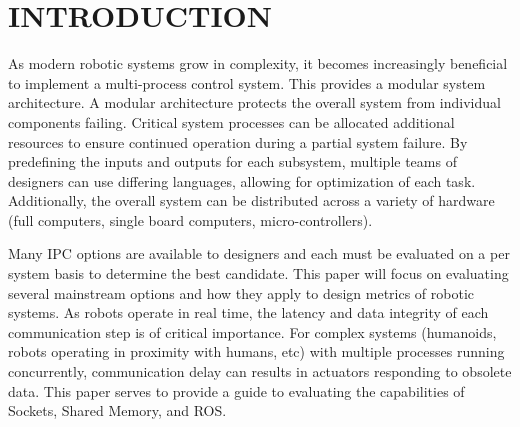 \section{INTRODUCTION}

As modern robotic systems grow in complexity, it becomes increasingly beneficial to implement a multi-process control system. This provides a modular system architecture. A modular architecture protects the overall system from individual components failing\cite{ACHLIBRARY}. Critical system processes can be allocated additional resources to ensure continued operation during a partial system failure. By predefining the inputs and outputs for each subsystem, multiple teams of designers can use differing languages, allowing for optimization of each task. Additionally, the overall system can be distributed across a variety of hardware (full computers, single board computers, micro-controllers)\cite{REALTIMEACH, EMBEDDEDROS, ACHHUBO}. 

Many IPC options are available to designers and each must be evaluated on a per system basis to determine the best candidate. This paper will focus on evaluating several mainstream options and how they apply to design metrics of robotic systems. As robots operate in real time, the latency and data integrity of each communication step is of critical importance\cite{IPCS}. For complex systems (humanoids, robots operating in proximity with humans, etc) with multiple processes running concurrently, communication delay can results in actuators responding to obsolete data\cite{ACHHUBO}. This paper serves to provide a guide to evaluating the capabilities of Sockets, Shared Memory, and ROS. 

